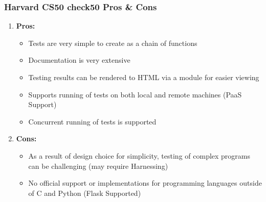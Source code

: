 \documentclass[xcolor]{beamer}
\begin{document}
\begin{frame}
	\frametitle{Harvard CS50 check50 Pros \& Cons}
	\begin{enumerate}
		\item \textbf{Pros:}
		\begin{itemize}
			\item Tests are very simple to create as a chain of functions
			\item Documentation is very extensive
			\item Testing results can be rendered to HTML via a module for easier viewing
			\item Supports running of tests on both local and remote machines (PaaS Support)
			\item Concurrent running of tests is supported 
		\end{itemize}
			\pause
		\item \textbf{Cons:}
		\begin{itemize}
			\item As a result of design choice for simplicity, testing of complex programs can be challenging (may require Harnessing)
			\item No official support or implementations for programming languages outside of C and Python (Flask Supported)
		\end{itemize}
	\end{enumerate}
\end{frame}
\end{document}
